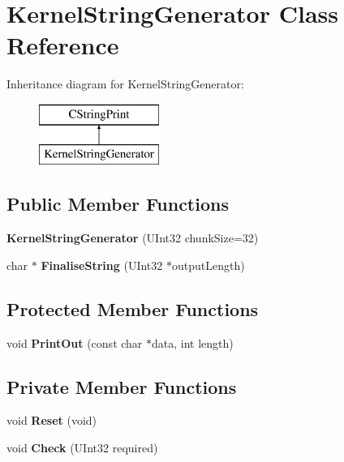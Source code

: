 \hypertarget{class_kernel_string_generator}{}\section{Kernel\+String\+Generator Class Reference}
\label{class_kernel_string_generator}
Inheritance diagram for Kernel\+String\+Generator\+:\begin{figure}[H]
\begin{center}
\leavevmode
\includegraphics[height=2.000000cm]{class_kernel_string_generator}
\end{center}
\end{figure}
\subsection*{Public Member Functions}
\begin{DoxyCompactItemize}
\item 
\mbox{\label{class_kernel_string_generator_aed849ce8806121b20469a7fe5f33c40b}} 
{\bfseries Kernel\+String\+Generator} (U\+Int32 chunk\+Size=32)
\item 
\mbox{\label{class_kernel_string_generator_a79e45d1c01848c2f0bd2a496a4c83053}} 
char $\ast$ {\bfseries Finalise\+String} (U\+Int32 $\ast$output\+Length)
\end{DoxyCompactItemize}
\subsection*{Protected Member Functions}
\begin{DoxyCompactItemize}
\item 
\mbox{\label{class_kernel_string_generator_a84f2470023f800d6ac2a1369e91b6168}} 
void {\bfseries Print\+Out} (const char $\ast$data, int length)
\end{DoxyCompactItemize}
\subsection*{Private Member Functions}
\begin{DoxyCompactItemize}
\item 
\mbox{\label{class_kernel_string_generator_a2b9465ee88845d031a4f72c954d7ed6d}} 
void {\bfseries Reset} (void)
\item 
\mbox{\label{class_kernel_string_generator_a8a310be1e6df62162d4a54244cd6600e}} 
void {\bfseries Check} (U\+Int32 required)
\end{DoxyCompactItemize}
